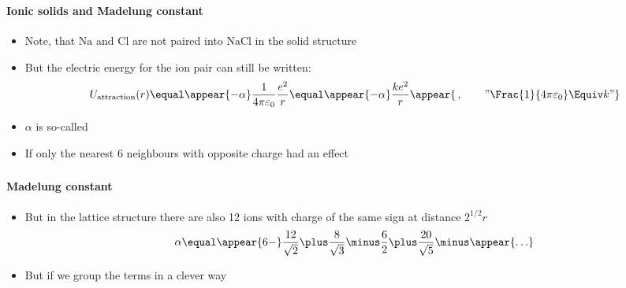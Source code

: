 \begin{frame}
\frametitle{\texorpdfstring{\culine[\sectiontitleulinecolor]{\sectiontitle}}{\sectiontitle} }
\framesubtitle{Ionic solids and Madelung constant}

\begin{itemize}
	\item Note, that $\mathrm{Na}$ and $\mathrm{Cl}$ are not paired into $\mathrm{NaCl}$ in the solid structure 
	
	\item But the electric energy for the ion pair can still be written:
\[ 
 U_{\text {attraction}}(r)  \equal \appear{-\alpha} \frac{1}{4 \pi \varepsilon_{0}} \frac{e^{2}}{r}  \equal \appear{-\alpha} \frac{k e^{2}}{r} \appear{\,,\qquad \text{''} \Frac{1}{4 \pi \varepsilon_{0}} \Equiv k \text{''} 
} \]%
 

\item $\alpha$ is so-called  

\item If only the nearest 6 neighbours with opposite charge had an effect 

\end{itemize}

\endofslide 
\end{frame}


\begin{frame}
\frametitle{\texorpdfstring{\culine[\sectiontitleulinecolor]{\sectiontitle}}{\sectiontitle} }
\framesubtitle{Madelung constant}

\begin{itemize}
	
\item But in the lattice structure there are also 12 ions with charge of the same sign at distance $2^{1 / 2} r$ 
\[ 
 \alpha  \equal \appear{6-} \frac{12}{\sqrt{2}} \plus \frac{8}{\sqrt{3}}  \minus \frac{6}{2} \plus \frac{20}{\sqrt{5}}  \minus \appear{\ldots}
 \]

\item But if we group the terms in a clever way
\end{itemize}

\endofslide 
\end{frame}

